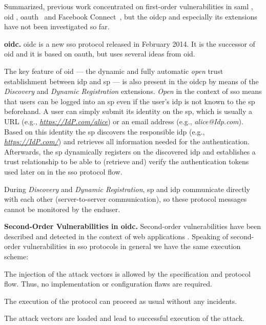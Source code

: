 \documentclass[conference,compsoc]{IEEEtran}
\renewcommand*{\paragraph}[1]{\vspace{2mm}\noindent\textbf{#1.}}
\begin{document}
Summarized, previous work concentrated on first-order vulnerabilities in \gls{saml} \cite{grossSAML,saas_ccsw14,SoMaScKaJeSAML12}, \gls{oid} \cite{sessionSwap,tsyr,journals/compsec/SunHB12}, \gls{oauth}~\cite{demystifiedOAuthCCS14,sun2012devil} and Facebook Connect~\cite{miculan2011formal,ssoscan}, but the \gls{oidcp} and especially its extensions have not been investigated so far.





\paragraph{\gls{oidc}}
\gls{oidc} is a new \gls{sso} protocol released in February 2014. It is the successor of \gls{oid} and it is based on \gls{oauth}, but uses several ideas from \gls{oid}.

The key feature of \gls{oid} --- the dynamic and fully automatic \emph{open} trust establishment between \gls{idp} and \gls{sp} --- is also present in the \gls{oidcp} by means of the \emph{Discovery} and \emph{Dynamic Registration} extensions.
\emph{Open} in the context of \gls{sso} means that users can be logged into an \gls{sp} even if the user's \gls{idp} is not known to the \gls{sp} beforehand.
A user can simply submit its identity on the \gls{sp}, which is usually a URL (e.g., \emph{\url{https://IdP.com/alice}}) or an email address (e.g., \emph{alice@Idp.com}).
Based on this identity the \gls{sp} discovers the responsible \gls{idp} (e.g., \emph{\url{https://IdP.com/}}) and retrieves all information needed for the authentication. Afterwards, the \gls{sp} dynamically registers on the discovered \gls{idp} and establishes a trust relationship to be able to (retrieve and) verify the authentication tokens used later on in the \gls{sso} protocol flow.


During \emph{Discovery} and \emph{Dynamic Registration},  \gls{sp} and  \gls{idp} communicate directly with each other (server-to-server communication), so these protocol messages cannot be monitored by the \gls{enduser}. 







\paragraph{Second-Order Vulnerabilities in \gls{oidc}}
Second-order vulnerabilities have been described and detected in the context of web applications \cite{bau2010state,Dahse2014,Olivo2015}.
Speaking of second-order vulnerabilities in \gls{sso} protocols in general we have the same execution scheme:
\begin{inparaenum}
	\item The injection of the attack vectors is allowed by the specification and protocol flow. Thus, no implementation or configuration flaws are required. 
	\item The execution of the protocol can proceed as usual without any incidents. 
	\item The attack vectors are loaded and lead to successful execution of the attack.
\end{inparaenum}
\end{document}
